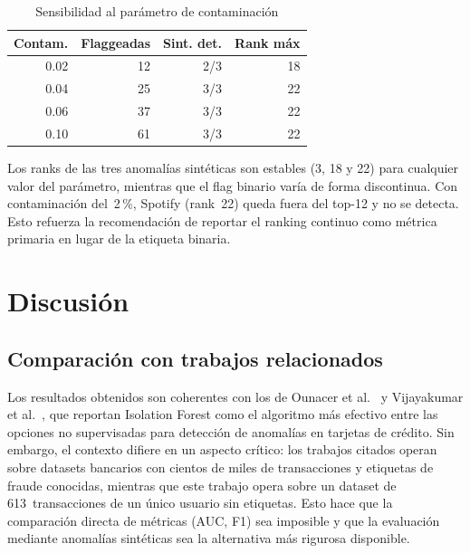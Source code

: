 \documentclass[conference]{IEEEtran}
\begin{document}
\begin{table}[h]
\caption{Sensibilidad al par\'ametro de contaminaci\'on}
\label{tab:contamination}
\centering
\begin{tabular}{rrrr}
\toprule
\textbf{Contam.} & \textbf{Flaggeadas} & \textbf{Sint. det.} & \textbf{Rank m\'ax} \\
\midrule
0.02 & 12 & 2/3 & 18 \\
0.04 & 25 & 3/3 & 22 \\
0.06 & 37 & 3/3 & 22 \\
0.10 & 61 & 3/3 & 22 \\
\bottomrule
\end{tabular}
\end{table}

Los ranks de las tres anomal\'ias sint\'eticas son estables (3, 18 y 22) para
cualquier valor del par\'ametro, mientras que el flag binario var\'ia de forma
discontinua. Con contaminaci\'on del~2\,\%, Spotify (rank~22) queda fuera del
top-12 y no se detecta. Esto refuerza la recomendaci\'on de reportar el ranking
continuo como m\'etrica primaria en lugar de la etiqueta binaria.

\section{Discusi\'on}
\label{sec:discusion}

\subsection{Comparaci\'on con trabajos relacionados}

Los resultados obtenidos son coherentes con los de Ounacer et
al.~\cite{ounacer2018isolation} y Vijayakumar et al.~\cite{vijayakumar2020isolation},
que reportan Isolation Forest como el algoritmo m\'as efectivo entre las opciones
no supervisadas para detecci\'on de anomal\'ias en tarjetas de cr\'edito. Sin
embargo, el contexto difiere en un aspecto cr\'itico: los trabajos citados operan
sobre datasets bancarios con cientos de miles de transacciones y etiquetas de fraude
conocidas, mientras que este trabajo opera sobre un dataset de 613~transacciones de
un \'unico usuario sin etiquetas. Esto hace que la comparaci\'on directa de m\'etricas
(AUC, F1) sea imposible y que la evaluaci\'on mediante anomal\'ias sint\'eticas sea
la alternativa m\'as rigurosa disponible.
\end{document}
